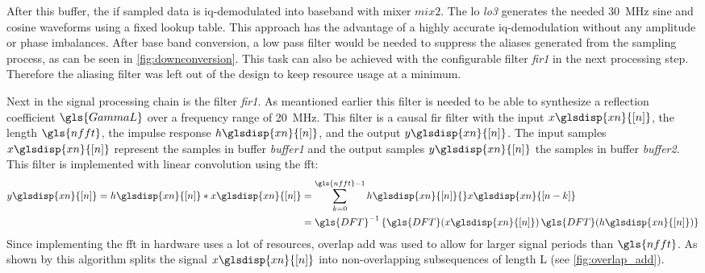 \documentclass[12pt,a4paper,parskip=full,abstract=true,BCOR=12mm,twoside,open=right]{scrreprt}
\def\device#1{\textit{#1}}
\newcommand{\XN}{\glsdisp{xn}{[n]}}
\begin{document}
After this buffer, the \gls{if} sampled data is \gls{iq}-demodulated into baseband
with mixer $mix2$. The \gls{lo} \device{lo3} generates the needed
\SI{30}{\mega\hertz} sine and cosine waveforms using a fixed lookup table. This
approach has the advantage of a highly accurate
\gls{iq}-demodulation without any amplitude or phase imbalances. After base band
conversion, a low pass filter would be needed to
suppress the aliases generated from the sampling process, as can be seen in
\cref{fig:downconversion}. This task can also be achieved with the configurable
filter \device{fir1} in the next processing step. Therefore the aliasing filter
was left out of the design to keep resource usage at a minimum.

Next in the signal processing chain is the filter \device{fir1}.
As meantioned earlier this filter is needed to be able to synthesize a reflection coefficient
$\gls{GammaL}$ over a frequency range of \SI{20}{\mega\hertz}. This filter is a causal \gls{fir} filter with
the input $x\XN$, the length $\gls{nfft}$, the impulse response $h\XN$, and the output $y\XN$. The input samples
$x\XN$ represent the samples in buffer \device{buffer1} and the output samples $y\XN$ the samples in buffer \device{buffer2}. This filter is
implemented with linear convolution using the \gls{fft}:
\begin{equation}
    \begin{split}
    \label{eq:circ} y\XN = h\XN * x\XN & = \sum_{k=0}^{\gls{nfft}-1} h\XN{}x\glsdisp{xn}{[n-k]}\\
         & = \gls{DFT}^{-1}\left\{\gls{DFT}(x\XN)\,\gls{DFT}(h\XN)\right\}
    \end{split}
\end{equation}
Since implementing the \gls{fft} in hardware uses a lot of resources, overlap add
was used to allow for larger signal periods than $\gls{nfft}$. As shown by \cite{schaums_2011}
this algorithm splits the signal $x\XN$ into non-overlapping
subsequences of length \gls{L} (see \cref{fig:overlap_add}).
\end{document}

